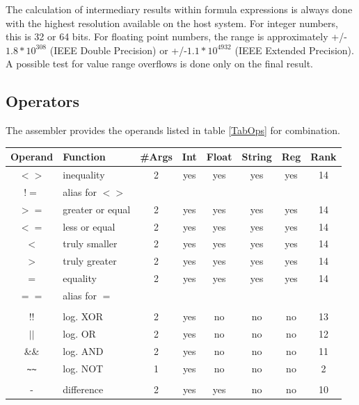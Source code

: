 \documentclass[12pt,twoside]{report}
\begin{document}
The calculation of intermediary results within formula expressions is
always done with the highest resolution available on the host system.
For integer numbers, this is 32 or 64 bits.  For floating point numbers,
the range is approximately +/-$1.8*10^{308}$ (IEEE Double Precision) or
+/-$1.1*10^{4932}$ (IEEE Extended Precision). A possible test for value
range overflows is done only on the final result.

\subsection{Operators}

The assembler provides the operands listed in table \ref{TabOps} for
combination.
\begin{table}[htbp]
\begin{center}\begin{tabular}{|c|l|c|c|c|c|c|c|}
\hline
Operand & Function            & \#Args & Int & Float & String & Reg & Rank \\
\hline
\hline
$<>$        & inequality       & 2 & yes   & yes & yes & yes & 14 \\
$!=$        & alias for $<>$   &   &       &     &     &     &    \\
$>=$        & greater or equal & 2 & yes   & yes & yes & yes & 14 \\
$<=$        & less or equal    & 2 & yes   & yes & yes & yes & 14 \\
$<$         & truly smaller    & 2 & yes   & yes & yes & yes & 14 \\
$>$         & truly greater    & 2 & yes   & yes & yes & yes & 14 \\
$=$         & equality         & 2 & yes   & yes & yes & yes & 14 \\
$==$        & alias for $=$    &   &       &     &     &     &    \\
            & & & & & &  \\
$!!$        & log. XOR         & 2 & yes   & no  & no  & no  & 13 \\
$||$        & log. OR          & 2 & yes   & no  & no  & no  & 12 \\
\&\&        & log. AND         & 2 & yes   & no  & no  & no  & 11 \\
\verb! ~~ ! & log. NOT         & 1 & yes   & no  & no  & no  & 2 \\
            & & & & & &  \\
-           & difference       & 2 & yes   & yes & no  & no  & 10 \\

\end{tabular}
\end{center}
\end{table}
\end{document}
